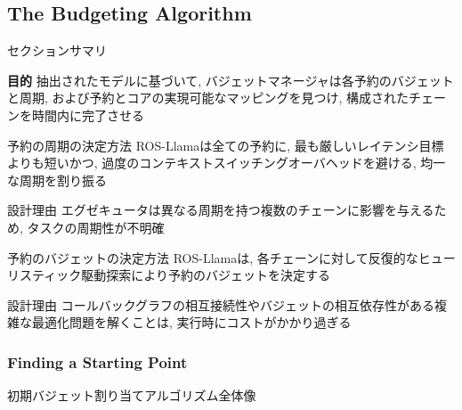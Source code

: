 \subsection{The Budgeting Algorithm}
\label{ssec: the budgeting algorithm}

\begin{frame}{セクションサマリ}
    \begin{itembox}[l]{\textbf{目的}}
        抽出されたモデルに基づいて, バジェットマネージャは各予約のバジェットと周期, および予約とコアの実現可能なマッピングを見つけ, 構成されたチェーンを時間内に完了させる
    \end{itembox}
\end{frame}

\begin{frame}{予約の周期の決定方法}
    ROS-Llamaは全ての予約に, 最も厳しいレイテンシ目標よりも短いかつ, 過度のコンテキストスイッチングオーバヘッドを避ける, 均一な周期を割り振る
    \begin{block}{設計理由}
        エグゼキュータは異なる周期を持つ複数のチェーンに影響を与えるため, タスクの周期性が不明確
    \end{block}
\end{frame}

\begin{frame}{予約のバジェットの決定方法}
    ROS-Llamaは, 各チェーンに対して反復的なヒューリスティック駆動探索により予約のバジェットを決定する
    \begin{block}{設計理由}
        コールバックグラフの相互接続性やバジェットの相互依存性がある複雑な最適化問題を解くことは, 実行時にコストがかかり過ぎる
    \end{block}
\end{frame}


\subsubsection{Finding a Starting Point}
\label{sssec: finding a starting point}

\begin{frame}{初期バジェット割り当てアルゴリズム全体像}
\end{frame}


